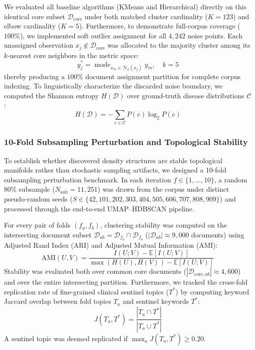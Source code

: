 \documentclass[a4paper,10pt,conference]{IEEEtran}
\begin{document}
We evaluated all baseline algorithms (KMeans and Hierarchical) directly on this identical core subset $\mathcal{D}_{\text{core}}$ under both matched cluster cardinality ($K=123$) and elbow cardinality ($K=5$). Furthermore, to demonstrate full-corpus coverage ($100\%$), we implemented soft outlier assignment for all $4{,}242$ noise points. Each unassigned observation $x_j \notin \mathcal{D}_{\text{core}}$ was allocated to the majority cluster among its $k$-nearest core neighbors in the metric space:
\begin{equation}
y_j^* = \operatorname{mode}_{x_m \in \mathcal{N}_k(x_j)} y_m, \quad k=5
\end{equation}
thereby producing a $100\%$ document assignment partition for complete corpus indexing. To linguistically characterize the discarded noise boundary, we computed the Shannon entropy $H(\mathcal{D})$ over ground-truth disease distributions $\mathcal{C}$:
\begin{equation}
H(\mathcal{D}) = - \sum_{c \in \mathcal{C}} P(c) \log_2 P(c)
\end{equation}

\subsubsection{10-Fold Subsampling Perturbation and Topological Stability}

To establish whether discovered density structures are stable topological manifolds rather than stochastic sampling artifacts, we designed a 10-fold subsampling perturbation benchmark. In each iteration $f \in \{1, \dots, 10\}$, a random $80\%$ subsample ($N_{\text{sub}} = 11{,}251$) was drawn from the corpus under distinct pseudo-random seeds ($S \in \{42, 101, 202, 303, 404, 505, 606, 707, 808, 909\}$) and processed through the end-to-end UMAP--HDBSCAN pipeline.

For every pair of folds $(f_a, f_b)$, clustering stability was computed on the intersecting document subset $\mathcal{D}_{ab} = \mathcal{D}_{f_a} \cap \mathcal{D}_{f_b}$ ($|\mathcal{D}_{ab}| \approx 9{,}000$ documents) using Adjusted Rand Index (ARI) and Adjusted Mutual Information (AMI):
\begin{equation}
\text{AMI}(U, V) = \frac{I(U; V) - \mathbb{E}[I(U; V)]}{\max(H(U), H(V)) - \mathbb{E}[I(U; V)]}
\end{equation}
Stability was evaluated both over common core documents ($|\mathcal{D}_{\text{core}, ab}| \approx 4{,}600$) and over the entire intersecting partition. Furthermore, we tracked the cross-fold replication rate of fine-grained clinical sentinel topics ($T^*$) by computing keyword Jaccard overlap between fold topics $T_a$ and sentinel keywords $T^*$:
\begin{equation}
J(T_a, T^*) = \frac{|T_a \cap T^*|}{|T_a \cup T^*|}
\end{equation}
A sentinel topic was deemed replicated if $\max_{a} J(T_a, T^*) \ge 0.20$.
\end{document}
